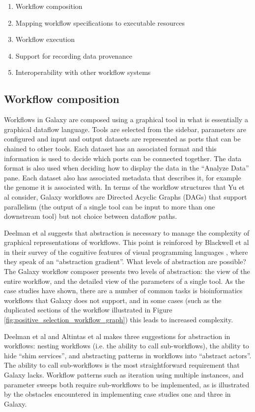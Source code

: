 \documentclass[a4paper,10pt]{scrreprt} \usepackage[utf8]{inputenc}
\begin{document}
\begin{enumerate}
\item Workflow composition
\item Mapping workflow specifications to executable resources
\item Workflow execution
\item Support for recording data provenance
\item Interoperability with other workflow systems
\end{enumerate}


\subsection{Workflow composition}

Workflows in Galaxy are composed using a graphical tool in what is essentially a graphical dataflow language. Tools are selected from the sidebar, parameters are configured and input and output datasets are represented as ports that can be chained to other tools. Each dataset has an associated format and this information is used to decide which ports can be connected together. The data format is also used when deciding how to display the data in the ``Analyze Data'' pane. Each dataset also has associated metadata that describes it, for example the genome it is associated with. In terms of the workflow structures that Yu et al \cite{yu_taxonomy_2005} consider, Galaxy workflows are Directed Acyclic Graphs (DAGs) that support parallelism (the output of a single tool can be input to more than one downstream tool) but not choice between dataflow paths.

Deelman et al \cite{deelman_workflows_2009} suggests that abstraction is necessary to manage the complexity of graphical representations of workflows. This point is reinforced by Blackwell et al in their survey of the cognitive features of visual programming languages \cite{blackwell_cognitive_2001}, where they speak of an ``abstraction gradient''. What levels of abstraction are possible? The Galaxy workflow composer presents two levels of abstraction: the view of the entire workflow, and the detailed view of the parameters of a single tool. As the case studies have shown, there are a number of common tasks is bioinformatics workflows that Galaxy does not support, and in some cases (such as the duplicated sections of the workflow illustrated in Figure \ref{fig:positive_selection_workflow_graph}) this leads to increased complexity.

Deelman et al and Altintas et al \cite{altintas_framework_2005} makes three suggestions for abstraction in workflows: nesting workflows (i.e. the ability to call sub-workflows), the ability to hide ``shim services'', and abstracting patterns in workflows into ``abstract actors''. The ability to call sub-workflows is the most straightforward requirement that Galaxy lacks. Workflow patterns such as iteration using multiple instances, and parameter sweeps both require sub-workflows to be implemented, as is illustrated by the obstacles encountered in implementing case studies one and three in Galaxy.
\end{document}

